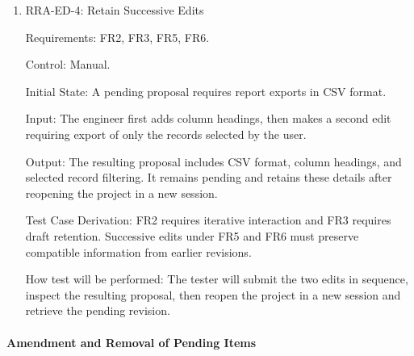 \documentclass[12pt, titlepage]{article}
\begin{document}
\begin{enumerate}
Requirements: FR2, FR3, FR5, FR6.

Control: Manual.

Initial State: A pending proposal requires reports to be emailed automatically
to all registered users every day.

Input: The engineer replaces that intent with on-demand report downloads and
explicitly prohibits automatic report emails.

Output: The revised proposal supports on-demand downloads and prohibits
automatic report emails. Daily scheduling and delivery to all users are not
retained as confirmed requirements. The revision remains pending review.

Test Case Derivation: FR5 and FR6 allow correction of a pending proposal,
including substantial changes. FR2 requires subsequent refinement to follow
the revised intent.

How test will be performed: The tester will replace the requirement, complete
any requested clarification, and inspect the resulting proposal for the new
behaviour and absence of the contradicted assumptions.

\item{RRA-ED-4: Retain Successive Edits\\}

Requirements: FR2, FR3, FR5, FR6.

Control: Manual.

Initial State: A pending proposal requires report exports in CSV format.

Input: The engineer first adds column headings, then makes a second edit
requiring export of only the records selected by the user.

Output: The resulting proposal includes CSV format, column headings, and
selected record filtering. It remains pending and retains these details after
reopening the project in a new session.

Test Case Derivation: FR2 requires iterative interaction and FR3 requires
draft retention. Successive edits under FR5 and FR6 must preserve compatible
information from earlier revisions.

How test will be performed: The tester will submit the two edits in sequence,
inspect the resulting proposal, then reopen the project in a new session and
retrieve the pending revision.

\end{enumerate}

\paragraph{Amendment and Removal of Pending Items}
\end{document}

